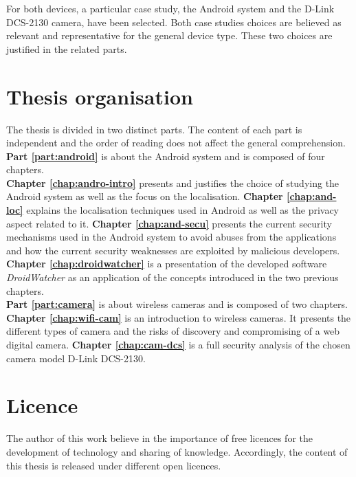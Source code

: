 For both devices, a particular case study, the Android system and the D-Link DCS-2130 camera, have been selected.
Both case studies choices are believed as relevant and representative for the general device type.
These two choices are justified in the related parts.


\section{Thesis organisation}

The thesis is divided in two distinct parts.
The content of each part is independent and the order of reading does not affect the general comprehension.\\

\textbf{Part \ref{part:android}} is about the Android system and is composed of four chapters.\\

\textbf{Chapter \ref{chap:andro-intro}} presents and justifies the choice of studying the Android system as well as the focus on the localisation.
\textbf{Chapter \ref{chap:and-loc}} explains the localisation techniques used in Android as well as the privacy aspect related to it.
\textbf{Chapter \ref{chap:and-secu}} presents the current security mechanisms used in the Android system to avoid abuses from the applications and how the current security weaknesses are exploited by malicious developers.
\textbf{Chapter \ref{chap:droidwatcher}} is a presentation of the developed software \emph{DroidWatcher} as an application of the concepts introduced in the two previous chapters.\\

\textbf{Part \ref{part:camera}} is about wireless cameras and is composed of two chapters.\\

\textbf{Chapter \ref{chap:wifi-cam}} is an introduction to wireless cameras.
It presents the different types of camera and the risks of discovery and compromising of a web digital camera.
\textbf{Chapter \ref{chap:cam-dcs}} is a full security analysis of the chosen camera model D-Link DCS-2130.

\section{Licence}

The author of this work believe in the importance of free licences for the development of technology and sharing of knowledge.
Accordingly, the content of this thesis is released under different open licences.\\

